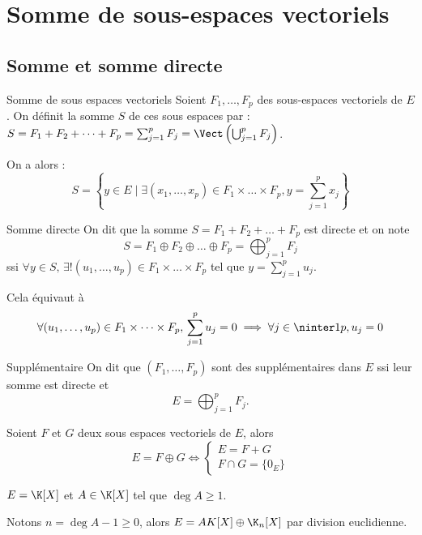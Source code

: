\section{Somme de sous-espaces vectoriels}
\subsection{Somme et somme directe}

\begin{definition}{Somme de sous espaces vectoriels}{}
    Soient $F_1, \dots, F_p$ des sous-espaces vectoriels de $E$. On définit la somme $S$ de ces sous espaces par : 
    $S = F_1 + F_2 + \dots + F_p = \sum_{j = 1 }^{p } F_j = \Vect \left( \bigcup_{j=1}^p F_j \right)$.

    On a alors :
    \[
        S = \left\{ y \in E \mid \exists (x_1, \dots, x_p) \in F_1 \times \dots \times F_p, y = \sum_{j=1}^p x_j \right\}
    \]

\end{definition}

\begin{definition}
    {Somme directe}{}
    On dit que la somme $S = F_1 + F_2 + \dots + F_p$ est directe et on note 
    $$S = F_1 \oplus F_2 \oplus \dots \oplus F_p = \bigoplus_{j=1}^p F_j$$
    ssi $\forall y \in S, \, \exists ! (u_1, \dots, u_p) \in F_1 \times \dots \times F_p$ tel que 
    $y = \sum_{j=1}^p u_j$.

    Cela équivaut à $$\forall (u_1, \dots, u_p) \in F_1 \times \dots \times F_p, \, \sum_{j=1}^p u_j = 0 \implies \forall j \in \ninter 1 p, u_j = 0$$
\end{definition}

\begin{definition}{Supplémentaire}{}
    On dit que $(F_1, \dots, F_p)$ sont des supplémentaires dans $E$ ssi leur somme 
    est directe et 
    $$E = \bigoplus_{j=1}^p F_j.$$
    
\end{definition}

\begin{proposition}{}{}
    Soient $F$ et $G$ deux sous espaces vectoriels de $E$, alors $$E = F \oplus G \iff
    \begin{cases}
        E = F + G \\
        F \cap G = \{0_E\}
    \end{cases}$$
\end{proposition}

\begin{exemple}
    $E = \K[X]$ et $A \in \K[X]$ tel que $\deg A \geqslant 1$.

    Notons $n = \deg A - 1 \geqslant 0$, alors $E = AK[X] \oplus \K_{n}[X]$ par division 
    euclidienne. 
\end{exemple}

